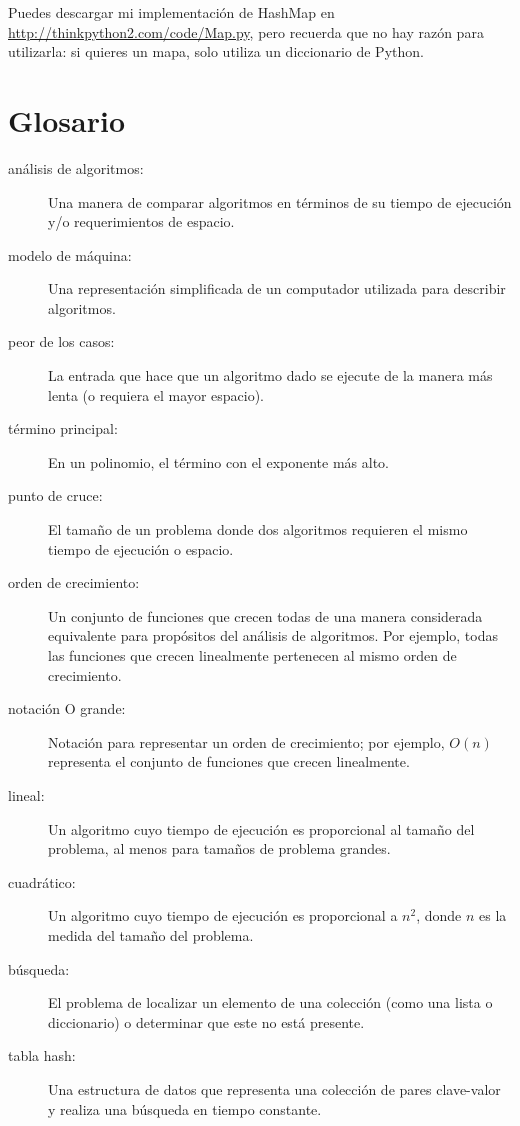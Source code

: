 \documentclass[10pt]{book}
\begin{document}
Puedes descargar mi implementación de HashMap en
\url{http://thinkpython2.com/code/Map.py}, pero recuerda que no hay
razón para utilizarla: si quieres un mapa, solo utiliza un diccionario de Python.

\section{Glosario}

\begin{description}

\item[análisis de algoritmos:] Una manera de comparar algoritmos en términos de
su tiempo de ejecución y/o requerimientos de espacio.

\item[modelo de máquina:] Una representación simplificada de un computador utilizada
para describir algoritmos.

\item[peor de los casos:] La entrada que hace que un algoritmo dado se ejecute de la manera más lenta (o
requiera el mayor espacio).

\item[término principal:] En un polinomio, el término con el exponente más alto.

\item[punto de cruce:] El tamaño de un problema donde dos algoritmos requieren
el mismo tiempo de ejecución o espacio.

\item[orden de crecimiento:] Un conjunto de funciones que crecen todas de una manera
considerada equivalente para propósitos del análisis de algoritmos.
Por ejemplo, todas las funciones que crecen linealmente pertenecen al mismo
orden de crecimiento.

\item[notación O grande:] Notación para representar un orden de crecimiento;
por ejemplo, $O(n)$ representa el conjunto de funciones que crecen
linealmente.

\item[lineal:] Un algoritmo cuyo tiempo de ejecución es proporcional al
tamaño del problema, al menos para tamaños de problema grandes.

\item[cuadrático:] Un algoritmo cuyo tiempo de ejecución es proporcional a
$n^2$, donde $n$ es la medida del tamaño del problema.

\item[búsqueda:] El problema de localizar un elemento de una colección
(como una lista o diccionario) o determinar que este no está presente.

\item[tabla hash:] Una estructura de datos que representa una colección de
pares clave-valor y realiza una búsqueda en tiempo constante.

\end{description}


\printindex

\clearemptydoublepage
\end{document}
